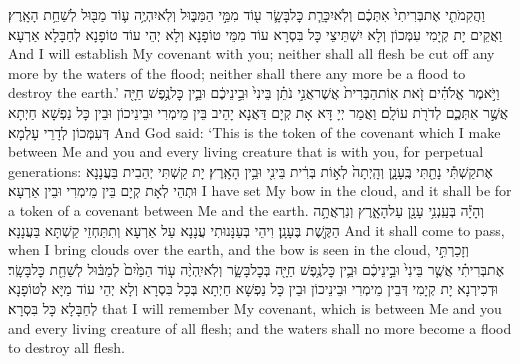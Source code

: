 {וַהֲקִמֹתִ֤י אֶת\maqqaf בְּרִיתִי֙ אִתְּכֶ֔ם וְלֹֽא\maqqaf יִכָּרֵ֧ת כׇּל\maqqaf בָּשָׂ֛ר ע֖וֹד מִמֵּ֣י הַמַּבּ֑וּל וְלֹֽא\maqqaf יִהְיֶ֥ה ע֛וֹד מַבּ֖וּל לְשַׁחֵ֥ת הָאָֽרֶץ׃}
{וַאֲקֵים יָת קְיָמִי עִמְּכוֹן וְלָא יִשְׁתֵּיצֵי כָּל בִּסְרָא עוֹד מִמֵּי טוֹפָנָא וְלָא יְהֵי עוֹד טוֹפָנָא לְחַבָּלָא אַרְעָא׃}
{And I will establish My covenant with you; neither shall all flesh be cut off any more by the waters of the flood; neither shall there any more be a flood to destroy the earth.’}{}
{וַיֹּ֣אמֶר אֱלֹהִ֗ים זֹ֤את אֽוֹת\maqqaf הַבְּרִית֙ אֲשֶׁר\maqqaf אֲנִ֣י נֹתֵ֗ן בֵּינִי֙ וּבֵ֣ינֵיכֶ֔ם וּבֵ֛ין כׇּל\maqqaf נֶ֥פֶשׁ חַיָּ֖ה אֲשֶׁ֣ר אִתְּכֶ֑ם לְדֹרֹ֖ת עוֹלָֽם׃}
{וַאֲמַר יְיָ דָּא אָת קְיָם דַּאֲנָא יָהֵיב בֵּין מֵימְרִי וּבֵינֵיכוֹן וּבֵין כָּל נַפְשָׁא חַיְתָא דְּעִמְּכוֹן לְדָרֵי עָלְמָא׃}
{And God said: ‘This is the token of the covenant which I make between Me and you and every living creature that is with you, for perpetual generations:}{}
{אֶת\maqqaf קַשְׁתִּ֕י נָתַ֖תִּי בֶּֽעָנָ֑ן וְהָֽיְתָה֙ לְא֣וֹת בְּרִ֔ית בֵּינִ֖י וּבֵ֥ין הָאָֽרֶץ׃}
{יָת קַשְׁתִּי יְהַבִית בַּעֲנָנָא וּתְהֵי לְאָת קְיָם בֵּין מֵימְרִי וּבֵין אַרְעָא׃}
{I have set My bow in the cloud, and it shall be for a token of a covenant between Me and the earth.}{}
{וְהָיָ֕ה בְּעַֽנְנִ֥י עָנָ֖ן עַל\maqqaf הָאָ֑רֶץ וְנִרְאֲתָ֥ה הַקֶּ֖שֶׁת בֶּעָנָֽן׃}
{וִיהֵי בְּעַנָּנוּתִי עֲנָנָא עַל אַרְעָא וְתִתַּחְזֵי קַשְׁתָּא בַּעֲנָנָא׃}
{And it shall come to pass, when I bring clouds over the earth, and the bow is seen in the cloud,}{}
{וְזָכַרְתִּ֣י אֶת\maqqaf בְּרִיתִ֗י אֲשֶׁ֤ר בֵּינִי֙ וּבֵ֣ינֵיכֶ֔ם וּבֵ֛ין כׇּל\maqqaf נֶ֥פֶשׁ חַיָּ֖ה בְּכׇל\maqqaf בָּשָׂ֑ר וְלֹֽא\maqqaf יִֽהְיֶ֨ה ע֤וֹד הַמַּ֙יִם֙ לְמַבּ֔וּל לְשַׁחֵ֖ת כׇּל\maqqaf בָּשָֽׂר׃}
{וּדְכִירְנָא יָת קְיָמִי דְּבֵין מֵימְרִי וּבֵינֵיכוֹן וּבֵין כָּל נַפְשָׁא חַיְתָא בְּכָל בִּסְרָא וְלָא יְהֵי עוֹד מַיָּא לְטוֹפָנָא לְחַבָּלָא כָּל בִּסְרָא׃}
{that I will remember My covenant, which is between Me and you and every living creature of all flesh; and the waters shall no more become a flood to destroy all flesh.}{}
